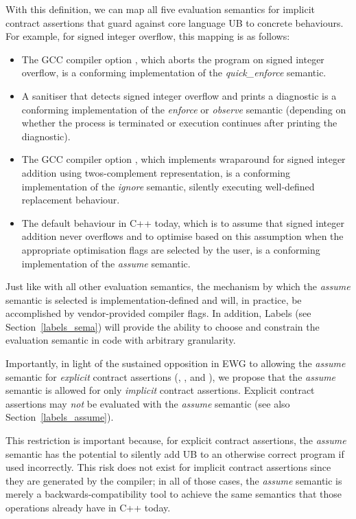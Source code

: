{With this definition, we can map all five evaluation semantics for implicit contract assertions that guard against core language UB to concrete behaviours. For example, for signed integer overflow, this mapping is as follows:
\begin{itemize}
\item The GCC compiler option , which aborts the program on signed integer overflow, is a conforming implementation of the \emph{quick_enforce} semantic.
\item A sanitiser that detects signed integer overflow and prints a diagnostic is a conforming
implementation of the \emph{enforce} or \emph{observe} semantic (depending on whether the
process is terminated or execution continues after printing the diagnostic).
\item The GCC compiler option , which implements wraparound for signed integer addition using twos-complement representation, is a conforming implementation of the \emph{ignore} semantic,  silently executing well-defined replacement behaviour.
\item The default behaviour in C++ today, which is to assume that signed integer addition never overflows and to optimise based on this assumption when the appropriate optimisation flags are selected by the user, is a conforming implementation of the \emph{assume} semantic.
\end{itemize}
Just like with all other evaluation semantics, the mechanism by which the \emph{assume} semantic is selected is implementation-defined and will, in practice, be accomplished by vendor-provided compiler flags. In addition, Labels (see Section~\ref{labels_sema}) will provide the ability to choose and constrain the evaluation semantic in code with arbitrary granularity.

Importantly, in light of the sustained opposition in EWG to allowing the \emph{assume} semantic for \emph{explicit} contract assertions (, , and ), we propose that the \emph{assume} semantic is allowed for only \emph{implicit} contract assertions. Explicit contract assertions may \emph{not} be evaluated with the \emph{assume} semantic (see also Section~\ref{labels_assume}).

This restriction is important because, for explicit contract assertions, the \emph{assume} semantic  has the potential to silently add UB to an otherwise correct program if used incorrectly. This risk does not exist for implicit contract assertions since they are generated by the compiler;  in all of those cases, the \emph{assume} semantic is merely a backwards-compatibility tool to achieve the same semantics that those operations already have in C++ today.

}
